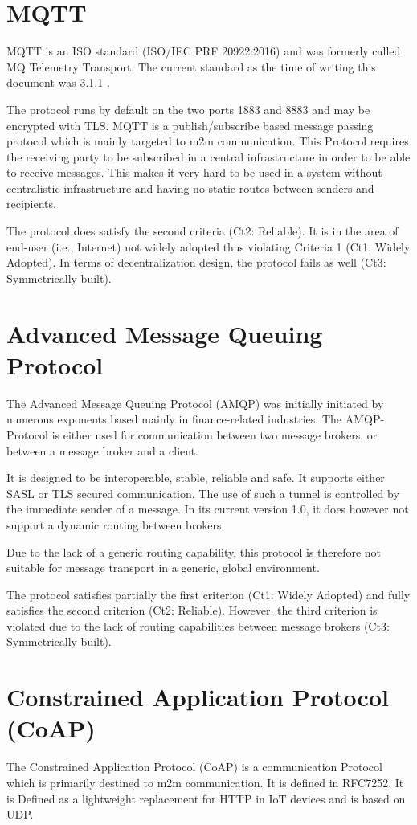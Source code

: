 \documentclass[a4paper,appendixprefix,pdfusetitle,twocolumn,fontsize=8pt,draft,DIV=calc]{scrbook}
\begin{document}
\section{MQTT}
MQTT is an ISO standard (ISO/IEC PRF 20922:2016) and was formerly called MQ Telemetry Transport. The current standard as the time of writing this document was 3.1.1 \cite{mqtt}. 

The protocol runs by default on the two ports 1883 and 8883 and may be encrypted with TLS. MQTT is a publish/subscribe based message passing protocol which is mainly targeted to m2m communication. This Protocol requires the receiving party to be subscribed in a central infrastructure in order to be able to receive messages. This makes it very hard to be used in a system without centralistic infrastructure and having no static routes between senders and recipients.

The protocol does satisfy the second criteria (Ct2: Reliable). It is in the area of end-user (i.e., Internet) not widely adopted thus violating Criteria 1 (Ct1: Widely Adopted). In terms of decentralization design, the protocol fails as well (Ct3: Symmetrically built).

\section{Advanced Message Queuing Protocol}
The Advanced Message Queuing Protocol (AMQP) was initially initiated by numerous exponents based mainly in finance-related industries. The AMQP-Protocol is either used for communication between two message brokers, or between a message broker and a client\cite{amqp}.

It is designed to be interoperable, stable, reliable and safe. It supports either SASL or TLS secured communication. The use of such a tunnel is controlled by the immediate sender of a message. In its current version 1.0, it does however not support a dynamic routing between brokers\cite{amqp}.

Due to the lack of a generic routing capability, this protocol is therefore not suitable for message transport in a generic, global environment.

The protocol satisfies partially the first criterion (Ct1: Widely Adopted) and fully satisfies the second criterion (Ct2: Reliable). However, the third criterion is violated due to the lack of routing capabilities between message brokers (Ct3: Symmetrically built).

\section{Constrained Application Protocol (CoAP)}
The Constrained Application Protocol (CoAP) is a communication Protocol which is primarily destined to m2m communication. It is defined in RFC7252\cite{RFC7252}.  It is Defined as a lightweight replacement for HTTP in IoT devices and is based on UDP.
\end{document}
